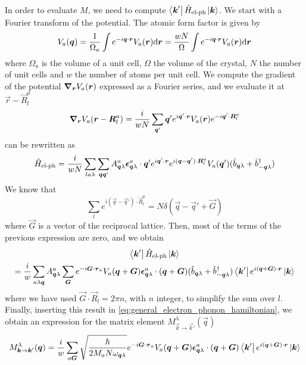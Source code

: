 In order to evaluate $M$, we need to compute $\bra{\mathbf{\boldsymbol{k}}'} \hat{H}_\text{el-ph} \ket{\mathbf{\boldsymbol{k}}}$. We start with a Fourier transform of the potential. The atomic form factor is given by
\begin{equation}
    V_a(\vec{q}) = \frac{1}{\Omega_a} \int e^{-i\vec{q
            }\cdot \vec{r}} V_a(\vec{r}) \differential \vec{r} = \frac{wN}{\Omega} \int e^{-i\vec{q
            }\cdot \vec{r}} V_a(\vec{r}) \differential \vec{r}
\end{equation}
where $\Omega_a$ is the volume of a unit cell, $\Omega$ the volume of the crystal, $N$ the number of unit cells and $w$ the number of atoms per unit cell. We compute the gradient of the potential $\grad_{\mathbf{\boldsymbol{r}}} V_a(\mathbf{\boldsymbol{r}})$ expressed as a Fourier series, and we evaluate it at $\vec{r}-\vec{R}_l^a$
\begin{equation}
    \grad_{\mathbf{\boldsymbol{r}}} V_a(\mathbf{\boldsymbol{r}} - \mathbf{\boldsymbol{R}}_l^a) = \frac{i}{wN} \sum_{\mathbf{\boldsymbol{q}}'} \mathbf{\boldsymbol{q}}' e^{i\mathbf{\boldsymbol{q}}'\cdot \mathbf{\boldsymbol{r}}} V_a(\mathbf{\boldsymbol{r}}) e^{-i\mathbf{\boldsymbol{q}}'\cdot \mathbf{\boldsymbol{R}}_l^a}
\end{equation}
 can be rewritten as
\begin{equation}
    \hat{H}_\text{el-ph} = \frac{i}{wN} \sum_{la\lambda} \sum_{\mathbf{\boldsymbol{q}}\mathbf{\boldsymbol{q}}'} A_{\mathbf{\boldsymbol{q}}\lambda}^a \mathbf{\boldsymbol{\epsilon}}_{\mathbf{\boldsymbol{q}}\lambda}^a \cdot \mathbf{\boldsymbol{q}}' e^{i\mathbf{\boldsymbol{q}}'\cdot \mathbf{\boldsymbol{r}}} e^{i(\mathbf{\boldsymbol{q}}-\mathbf{\boldsymbol{q}}') \cdot \mathbf{\boldsymbol{R}}_l^a} V_a(\mathbf{\boldsymbol{q}}'   )  (\hat{b}_{\mathbf{\boldsymbol{q}}\lambda} + \hat{b}^\dagger_{-\mathbf{\boldsymbol{q}}\lambda})
\end{equation}
We know that
\begin{equation}
    \sum_l e^{i(\vec{q}-\vec{q}') \cdot \vec{R}_l^a} = N \delta(\vec{q} - \vec{q}' + \vec{G})
\end{equation}
where $\vec{G}$ is a vector of the reciprocal lattice. Then, most of the terms of the previous expression are zero, and we obtain
\begin{multline}
    \bra{\mathbf{\boldsymbol{k}}'}\hat{H}_\text{el-ph}\ket{\mathbf{\boldsymbol{k}}}
    \\ = \frac{i}{w} \sum_{a\lambda\mathbf{\boldsymbol{q}}} A_{\mathbf{\boldsymbol{q}}\lambda}^a \sum_{\mathbf{\boldsymbol{G}}}  e^{-i \mathbf{\boldsymbol{G}} \cdot \mathbf{\boldsymbol{\tau}}_a} V_a(\mathbf{\boldsymbol{q}} + \mathbf{\boldsymbol{G}}   ) \mathbf{\boldsymbol{\epsilon}}_{\mathbf{\boldsymbol{q}}\lambda}^a \cdot (\mathbf{\boldsymbol{q}}+\mathbf{\boldsymbol{G}}) (\hat{b}_{\mathbf{\boldsymbol{q}}\lambda} + \hat{b}^\dagger_{-\mathbf{\boldsymbol{q}}\lambda}) \bra{\mathbf{\boldsymbol{k}}'} e^{i(\mathbf{\boldsymbol{q}} + \mathbf{\boldsymbol{G}})\cdot \mathbf{\boldsymbol{r}}} \ket{\mathbf{\boldsymbol{k}}}
\end{multline}
where we have used $\vec{G} \cdot \vec{R}_l = 2\pi n$, with $n$ integer, to simplify the sum over $l$. Finally, inserting this result in \cref{eq:general_electron_phonon_hamiltonian}, we obtain an expression for the matrix element $M_{\vec{k} \rightarrow \vec{k}'}^\lambda(\vec{q})$
\begin{equation}
    M_{\mathbf{\boldsymbol{k}} \rightarrow \mathbf{\boldsymbol{k}}'}^\lambda(\mathbf{\boldsymbol{q}}) =  \frac{i}{w} \sum_{a\mathbf{\boldsymbol{G}}} \sqrt{\frac{\hbar}{2M_aN\omega_{\mathbf{\boldsymbol{q}}\lambda}}}  e^{-i \mathbf{\boldsymbol{G}} \cdot \mathbf{\boldsymbol{\tau}}_a} V_a(\mathbf{\boldsymbol{q}} + \mathbf{\boldsymbol{G}}) \mathbf{\boldsymbol{\epsilon}}_{\mathbf{\boldsymbol{q}}\lambda}^a \cdot (\mathbf{\boldsymbol{q}}+\mathbf{\boldsymbol{G}}) \bra{\mathbf{\boldsymbol{k}}'} e^{i(\mathbf{\boldsymbol{q}} + \mathbf{\boldsymbol{G}})\cdot \mathbf{\boldsymbol{r}}} \ket{\mathbf{\boldsymbol{k}}}
\end{equation}

